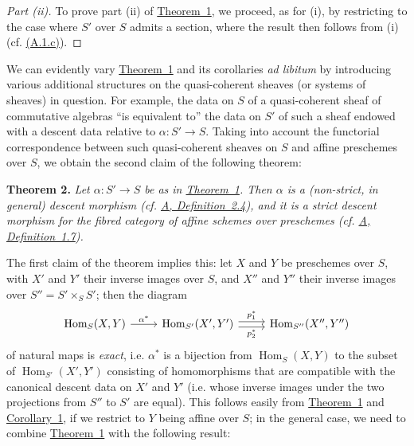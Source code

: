 \documentclass{article}
\newenvironment{itenv}[1]
  {\phantomsection\par\medskip\noindent\textbf{#1.}\itshape}
  {\medskip}
\DeclareMathOperator{\Hom}{Hom}
\newcommand{\oldpage}[1]{\marginpar{\footnotesize$\Big\vert$ \textit{p.~#1}}}
\begin{document}
\begin{proof}[Part (ii)]
To prove part (ii) of \hyperref[theorem:B.1(1)]{Theorem~1}, we proceed, as for (i), by restricting to the case where $S'$ over $S$ admits a section, where the result then follows from (i) (cf. \hyperref[A.1.c]{(A.1.c)}).
\end{proof}

We can evidently vary \hyperref[theorem:B.1(1)]{Theorem~1} and its corollaries \emph{ad libitum} by introducing various additional structures on the quasi-coherent sheaves (or systems of sheaves) in question.
For example, the data on $S$ of a
\oldpage{190-19}
quasi-coherent sheaf of commutative algebras ``is equivalent to'' the data on $S'$ of such a sheaf endowed with a descent data relative to $\alpha\colon S'\to S$.
Taking into account the functorial correspondence between such quasi-coherent sheaves on $S$ and affine preschemes over $S$, we obtain the second claim of the following theorem:

\begin{itenv}{Theorem 2}
\label{theorem:B.1(2)}
  Let $\alpha\colon S'\to S$ be as in \hyperref[theorem:B.1(1)]{Theorem~1}.
  Then $\alpha$ is a (non-strict, in general) \emph{descent morphism} (cf. \hyperref[definition:A.2.4]{A, Definition~2.4}), and it is a \emph{strict descent morphism} for the fibred category of affine schemes over preschemes (cf. \hyperref[definition:A.1.7]{A, Definition~1.7}).
\end{itenv}

The first claim of the theorem implies this:
let $X$ and $Y$ be preschemes over $S$, with $X'$ and $Y'$ their inverse images over $S$, and $X''$ and $Y''$ their inverse images over $S''=S'\times_S S'$;
then the diagram
\[
  \begin{tikzcd}
    \Hom_S(X,Y) \rar["\alpha^*"]
    & \Hom_{S'}(X',Y') \rar[shift left=1,"p_1^*"] \rar[shift right=1,swap,"p_2^*"]
    & \Hom_{S''}(X'',Y'')
  \end{tikzcd}
\]
of natural maps is \emph{exact}, i.e. $\alpha^*$ is a bijection from $\Hom_S(X,Y)$ to the subset of $\Hom_{S'}(X',Y')$ consisting of homomorphisms that are compatible with the canonical descent data on $X'$ and $Y'$ (i.e. whose inverse images under the two projections from $S''$ to $S'$ are equal).
This follows easily from \hyperref[theorem:B.1(1)]{Theorem~1} and \hyperref[corollary:B.1(1)]{Corollary~1}, if we restrict to $Y$ being affine over $S$;
in the general case, we need to combine \hyperref[theorem:B.1(1)]{Theorem~1} with the following result:
\end{document}
